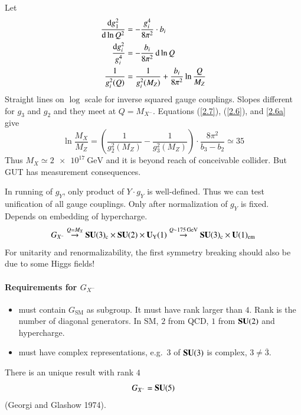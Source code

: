 Let
\begin{align}
   \dv{g_1^2}{\ln Q^2} &= - \frac{g^4_i}{8\pi^2} \cdot b_i \notag \\
   \frac{\dd{g_i^2}}{g_i^4} &= - \frac{b_i}{8\pi^2} \dd{\ln Q} \notag \\
   \frac{1}{g_i^2(Q)} &= \frac{1}{g_i^2(M_Z)} + \frac{b_i}{8\pi^2} \ln \frac{Q}{M_Z} \label{2.7}
\end{align}
Straight lines on $\log$ scale for inverse squared gauge couplings. Slopes different for $g_3$ and $g_2$ and they meet at $Q = M_{X^-}$. Equations (\ref{2.7}), (\ref{2.6}), and \eqref{2.6a} give
\begin{equation}
   \ln \frac{M_X}{M_Z} = \left( \frac{1}{g_2^2(M_Z)} - \frac{1}{g_3^2(M_Z)} \right) \cdot \frac{8\pi^2}{b_3 - b_2} \simeq 35 \label{2.8}
\end{equation}
Thus $M_X \simeq \SI{2e17}{\giga\eV}$ and it is beyond reach of conceivable collider. But GUT has measurement consequences.

In running of $g_Y$, only product of $Y\cdot g_Y$ is well-defined. Thus we can test unification of all gauge couplings. Only after normalization of $g_Y$ is fixed. Depends on embedding of hypercharge.
\begin{equation}
   G_{X^-} \stackrel{Q=M_X}{\rightarrow} \SU(3)_\text{c} \times \SU(2) \times \Uni_\text{Y}(1) \stackrel{Q\sim \SI{175}{\giga \eV}}{\rightarrow} \SU(3)_\text{c} \times \Uni(1)_\text{em} \label{2.9}
\end{equation}
For unitarity and renormalizability, the first symmetry breaking should also be due to some Higgs fields!

\paragraph{Requirements for $G_{X^-}$} 
\begin{itemize}
   \item must contain $G_\text{SM}$ as subgroup. It must have rank larger than $4$. Rank is the number of diagonal generators. In SM, $2$ from QCD, $1$ from $\mathbf{SU}(2)$ and hypercharge.
   \item must have complex representations, e.g.~$3$ of $\mathbf{SU}(3)$ is complex, $3 \neq \overline{3}$.
\end{itemize}
There is an unique result with rank $4$
\begin{equation*}
   G_{X^-} = \mathbf{SU}(5)
\end{equation*}
(Georgi and Glashow 1974).

